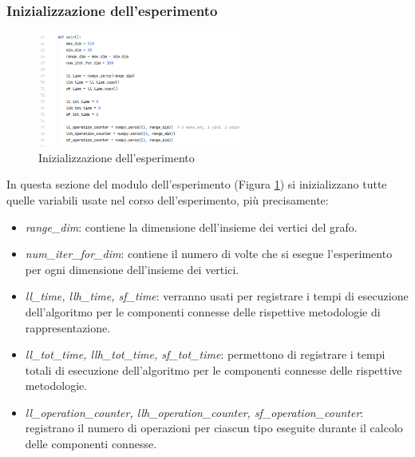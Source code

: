 \documentclass[12pt]{article}
\begin{document}
\subsubsection{Inizializzazione dell'esperimento}
\begin{figure}[h]
    \centering
    \includegraphics[width=0.6\textwidth]{images/main_code_images/main_inizialization.png}
    \caption{Inizializzazione dell'esperimento}
    \label{fig:main_init}
\end{figure}
In questa sezione del modulo dell'esperimento (Figura \ref{fig:main_init}) si inizializzano tutte quelle variabili usate nel corso dell'esperimento, più precisamente:
\begin{itemize}
    \item \textit{range\_dim}: contiene la dimensione dell'insieme dei vertici del grafo.
    \item \textit{num\_iter\_for\_dim}: contiene il numero di volte che si esegue l'esperimento per ogni dimensione dell'insieme dei vertici.
    \item \textit{ll\_time, llh\_time, sf\_time}: verranno usati per registrare i tempi di esecuzione  dell'algoritmo per le componenti connesse delle rispettive metodologie di rappresentazione.
    \item \textit{ll\_tot\_time, llh\_tot\_time, sf\_tot\_time}: permettono di registrare i tempi totali di esecuzione dell'algoritmo per le componenti connesse delle rispettive metodologie.
    \item \textit{ll\_operation\_counter, llh\_operation\_counter, sf\_operation\_counter}: registrano il numero di operazioni per ciascun tipo eseguite durante il calcolo delle componenti connesse.
\end{itemize}
\end{document}
